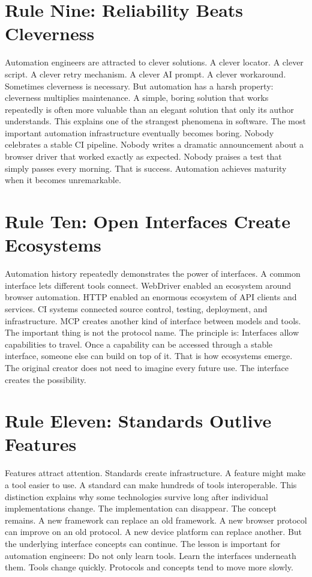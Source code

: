 \documentclass[11pt,twoside]{book}
\begin{document}
\section*{Rule Nine: Reliability Beats Cleverness}

Automation engineers are attracted to clever solutions.
A clever locator.
A clever script.
A clever retry mechanism.
A clever AI prompt.
A clever workaround.
Sometimes cleverness is necessary.
But automation has a harsh property:
cleverness multiplies maintenance.
A simple, boring solution that works repeatedly is often more valuable than an elegant solution that only its author understands.
This explains one of the strangest phenomena in software.
The most important automation infrastructure eventually becomes boring.
Nobody celebrates a stable CI pipeline.
Nobody writes a dramatic announcement about a browser driver that worked exactly as expected.
Nobody praises a test that simply passes every morning.
That is success.
Automation achieves maturity when it becomes unremarkable.

\section*{Rule Ten: Open Interfaces Create Ecosystems}

Automation history repeatedly demonstrates the power of interfaces.
A common interface lets different tools connect.
WebDriver enabled an ecosystem around browser automation.
HTTP enabled an enormous ecosystem of API clients and services.
CI systems connected source control, testing, deployment, and infrastructure.
MCP creates another kind of interface between models and tools.
The important thing is not the protocol name.
The principle is:
Interfaces allow capabilities to travel.
Once a capability can be accessed through a stable interface, someone else can build on top of it.
That is how ecosystems emerge.
The original creator does not need to imagine every future use.
The interface creates the possibility.

\section*{Rule Eleven: Standards Outlive Features}

Features attract attention.
Standards create infrastructure.
A feature might make a tool easier to use.
A standard can make hundreds of tools interoperable.
This distinction explains why some technologies survive long after individual implementations change.
The implementation can disappear.
The concept remains.
A new framework can replace an old framework.
A new browser protocol can improve on an old protocol.
A new device platform can replace another.
But the underlying interface concepts can continue.
The lesson is important for automation engineers:
Do not only learn tools. Learn the interfaces underneath them.
Tools change quickly.
Protocols and concepts tend to move more slowly.
\end{document}
